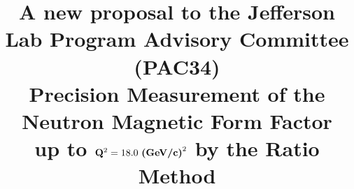 \documentclass[12pt,letterpaper,oneside]{article}
\begin{document}

\newcommand{\mMeV} {\,\mbox{MeV}/\mbox{c}^{2}}
\newcommand{\pMeV} {\,\mbox{MeV}/\mbox{c}}
\newcommand{\eMeV} {\,\mbox{MeV}}
\newcommand{\mGeV} {\,\mbox{GeV}/\mbox{c}^{2}}
\newcommand{\pGeV} {\,\mbox{GeV}/\mbox{c}}
\newcommand{\eGeV} {\,\mbox{GeV}}
\newcommand{\gmn} {G$^{\mbox{\scriptsize n}}_{_{\mbox{\tiny M}}}~$}
\newcommand{\gmnc} {G$^{\mbox{\scriptsize n}}_{_{\mbox{\tiny M}}}$}
\newcommand{\gen} {G$^{\mbox{\scriptsize n}}_{_{\mbox{\tiny E}}}~$}
\newcommand{\genc} {G$^{\mbox{\scriptsize n}}_{_{\mbox{\tiny E}}}$}
\newcommand{\gmp} {G$^{\mbox{\scriptsize p}}_{_{\mbox{\tiny M}}}~$}
\newcommand{\gmpc} {G$^{\mbox{\scriptsize p}}_{_{\mbox{\tiny M}}}$}
\newcommand{\gep} {G$^{\mbox{\scriptsize p}}_{_{\mbox{\tiny E}}}~$}
\newcommand{\gepc} {G$^{\mbox{\scriptsize p}}_{_{\mbox{\tiny E}}}$}


\title{A new proposal to the Jefferson Lab Program Advisory Committee
  (PAC34)\\
{\bf Precision Measurement of the\\
 Neutron Magnetic Form Factor\\
 up to $\mathbf Q^2=18.0\mbox{ \bf (GeV/c)}^2$ by the Ratio Method}}



\vspace{0.1in}
\end{document}
